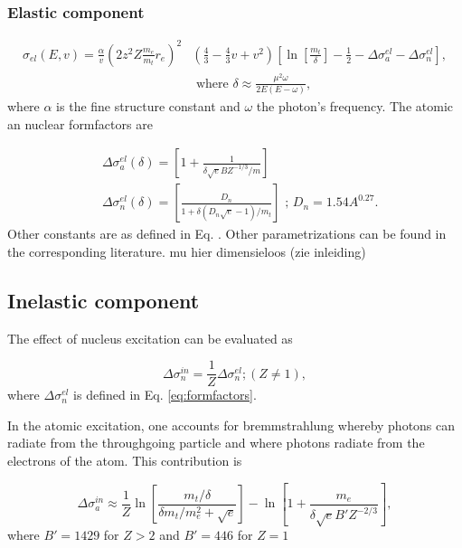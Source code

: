 \subsubsection{Elastic component}
\begin{equation}
\begin{split}
\sigma_{el} (E,v) = \frac{ \alpha}{v} \left(2 z^2 Z \frac{m_e}{m_t} r_e\right)^2
 &\left(\frac{4}{3} - \frac{4}{3}v +v^2 \right) \left[\ln \left[\frac{m_t}{\delta}\right] - \frac{1}{2} - \Delta \sigma^{el}_a -\Delta \sigma^{el}_ n \right],\\
& \textrm{ \ \ where \ \ } \delta \approx \frac{\mu^2 \omega}{2E(E-\omega)},
\end{split}
\end{equation}
where $\alpha$ is the fine structure constant and $\omega$ the photon's frequency. The atomic an nuclear formfactors are

\begin{equation}
\label{eq:formfactors}
\begin{split}
&\Delta \sigma^{el}_a(\delta) = \left[ 1+ \frac{1}{\delta \sqrt{e} BZ^{-1/3}/m}\right] \\
&\Delta \sigma^{el}_n(\delta) = \left[\frac{D_n}{1+\delta (D_n \sqrt{e} -1)/m_t}\right] \textrm{ \ \ ; } D_n = 1.54 {A^0.27}.
\end{split}
\end{equation}
Other constants are as defined in Eq. \cite{eq:ioniz}. Other parametrizations can be found in the corresponding literature. 
mu hier dimensieloos (zie inleiding)

\subsection{Inelastic component}

The effect of nucleus excitation can be evaluated as

\begin{equation}
\Delta \sigma^{in}_n = \frac{1}{Z} \Delta \sigma^{el}_n; (Z \neq 1),
 \end{equation}
where $\Delta \sigma^{el}_n$ is defined in Eq. \ref{eq:formfactors}.

In the atomic excitation, one accounts for bremmstrahlung whereby photons can radiate from the throughgoing particle and where photons radiate from the electrons of the atom. This contribution is

\begin{equation}
\Delta \sigma^{in}_a \approx \frac{1}{Z} \ln \left[ \frac{m_t/\delta}{\delta m_t/m_e^2 + \sqrt{e}} \right] - \ln\left[1+ \frac{m_e}{\delta \sqrt{e} B' Z^{-2/3}} \right],
\end{equation}
where $B'=1429$ for $Z > 2$ and $B' = 446$ for $Z=1$
